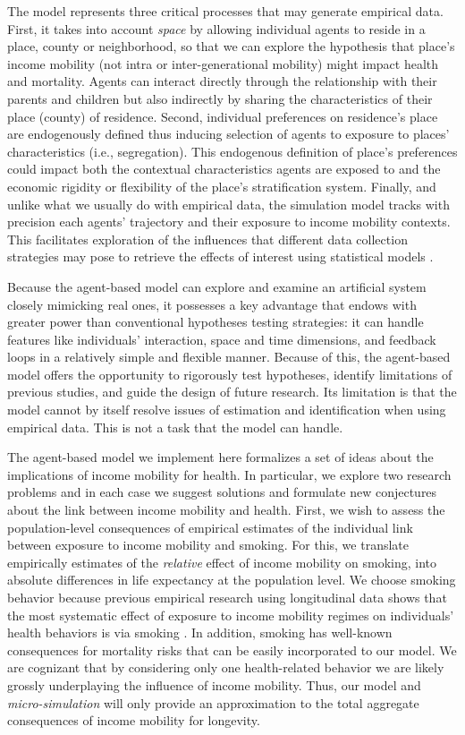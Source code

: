 \documentclass[class=article, crop=false, 12pt]{standalone}
\begin{document}
The model represents three critical processes that may generate empirical data. First, it takes into account \textit{space} by allowing individual agents to reside in a place, county or neighborhood, so that we can explore the hypothesis that place's income mobility (not intra or inter-generational mobility) might impact health and mortality. Agents can interact directly through the relationship with their parents and children but also indirectly by sharing the characteristics of their place (county) of residence. Second, individual preferences on residence's place are endogenously defined thus inducing selection of agents to exposure  to places' characteristics (i.e., segregation). This endogenous definition of place's preferences could impact both the contextual characteristics agents are exposed to and the economic rigidity or flexibility of the place's stratification system. Finally, and unlike what we usually do with empirical data, the simulation model tracks with precision each agents' trajectory and their exposure to income mobility contexts. This facilitates exploration of the influences that different data collection strategies may pose to retrieve the effects of interest using statistical models \citep{daza2019}. 

Because the agent-based model can explore and examine an artificial system closely mimicking real ones, it possesses a key advantage that endows with greater power than conventional hypotheses testing strategies: it can handle features like individuals' interaction, space and time dimensions, and feedback loops in a relatively simple and flexible manner. Because of this, the agent-based model offers the opportunity to rigorously test hypotheses, identify limitations of previous studies, and guide the design of future research. Its limitation is that the model cannot by itself resolve issues of estimation and identification when using empirical data. This is not a task that the model can handle. 


The agent-based model we implement here formalizes a set of ideas about the implications of income mobility for health. In particular, we explore two research problems and in each case we suggest solutions and formulate new conjectures about the link between income mobility and health. First, we wish to assess the population-level consequences of empirical estimates of the individual link between exposure to income mobility and smoking. For this, we translate empirically estimates of the \textit{relative} effect of income mobility on smoking, into absolute differences in life expectancy at the population level. We choose smoking behavior because previous empirical research using longitudinal data shows that the most systematic effect of exposure to income mobility regimes on individuals' health behaviors is via smoking \citep{daza2021}. In addition, smoking has well-known consequences for mortality risks that can be easily incorporated to our model. We are cognizant that by considering only one health-related behavior we are likely grossly underplaying the influence of income mobility. Thus, our model and \textit{ micro-simulation} will only provide an approximation to the total aggregate consequences of income mobility for longevity.
\end{document}
